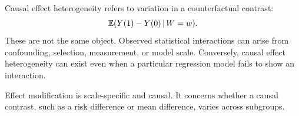 Causal effect heterogeneity refers to variation in a counterfactual contrast:
\[
\mathbb{E}(Y(1)-Y(0)\,\vert\, W=w).
\]
These are not the same object. Observed statistical interactions can arise from confounding, selection, measurement, or model scale. Conversely, causal effect heterogeneity can exist even when a particular regression model fails to show an interaction.

\begin{keyidea}
Effect modification is scale-specific and causal. It concerns whether a causal contrast, such as a risk difference or mean difference, varies across subgroups.
\end{keyidea}
